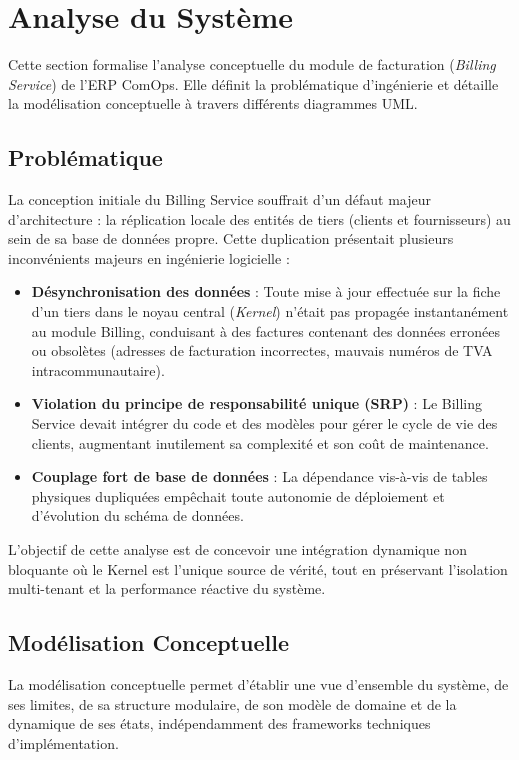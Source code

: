 \chapter{Analyse du Système}

Cette section formalise l'analyse conceptuelle du module de facturation (\textit{Billing Service}) de l'ERP ComOps. Elle définit la problématique d'ingénierie et détaille la modélisation conceptuelle à travers différents diagrammes UML.

\section{Problématique}
La conception initiale du Billing Service souffrait d'un défaut majeur d'architecture : la réplication locale des entités de tiers (clients et fournisseurs) au sein de sa base de données propre. Cette duplication présentait plusieurs inconvénients majeurs en ingénierie logicielle :
\begin{itemize}
    \item \textbf{Désynchronisation des données} : Toute mise à jour effectuée sur la fiche d'un tiers dans le noyau central (\textit{Kernel}) n'était pas propagée instantanément au module Billing, conduisant à des factures contenant des données erronées ou obsolètes (adresses de facturation incorrectes, mauvais numéros de TVA intracommunautaire).
    \item \textbf{Violation du principe de responsabilité unique (SRP)} : Le Billing Service devait intégrer du code et des modèles pour gérer le cycle de vie des clients, augmentant inutilement sa complexité et son coût de maintenance.
    \item \textbf{Couplage fort de base de données} : La dépendance vis-à-vis de tables physiques dupliquées empêchait toute autonomie de déploiement et d'évolution du schéma de données.
\end{itemize}
L'objectif de cette analyse est de concevoir une intégration dynamique non bloquante où le Kernel est l'unique source de vérité, tout en préservant l'isolation multi-tenant et la performance réactive du système.

\section{Modélisation Conceptuelle}
La modélisation conceptuelle permet d'établir une vue d'ensemble du système, de ses limites, de sa structure modulaire, de son modèle de domaine et de la dynamique de ses états, indépendamment des frameworks techniques d'implémentation.

